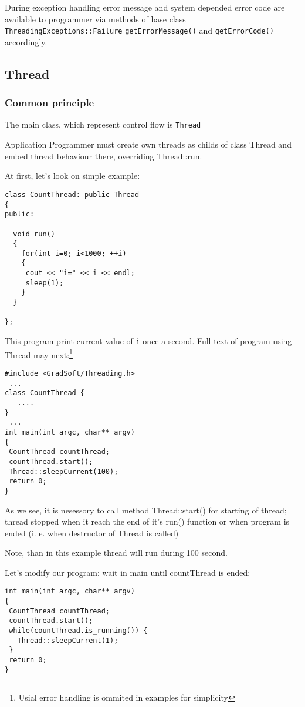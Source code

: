 \documentclass[10pt]{article}
\begin{document}
 During exception handling error message and system depended error code are 
available to programmer via methods of base class 
\verb|ThreadingExceptions::Failure| \verb|getErrorMessage()| and \verb|getErrorCode()| accordingly.

\subsection{ Thread }

\subsubsection{ Common principle } \label{Thread-general}

  The main class, which represent control flow is \verb|Thread|

  Application Programmer must create own threads as childs of class Thread 
and embed thread behaviour there, overriding Thread::run. 

 At first, let's look on simple example:

\begin{verbatim}
class CountThread: public Thread
{
public:

  void run()
  {
    for(int i=0; i<1000; ++i)
    {
     cout << "i=" << i << endl;
     sleep(1);
    } 
  }

};
\end{verbatim}

 This program print current value of \verb|i| once a second.
Full text of program using Thread may next:\footnote{Usial error handling
is ommited in examples for simplicity}

\begin{verbatim}
#include <GradSoft/Threading.h>
 ...
class CountThread {
   ....
}
 ...
int main(int argc, char** argv)
{
 CountThread countThread;
 countThread.start();
 Thread::sleepCurrent(100);
 return 0;
}
\end{verbatim}

 As we see, it is nesessory to call method Thread::start() for starting
of thread; thread stopped when it reach the end of it's run() function
 or when program is ended (i. e. when destructor of Thread is
called) 

Note, than in this example thread will run during 100 second.

Let's modify our program: wait in main until countThread is
ended:

\begin{verbatim}
int main(int argc, char** argv)
{
 CountThread countThread;
 countThread.start();
 while(countThread.is_running()) {
   Thread::sleepCurrent(1);
 }
 return 0;
}
\end{verbatim}
\end{document}
